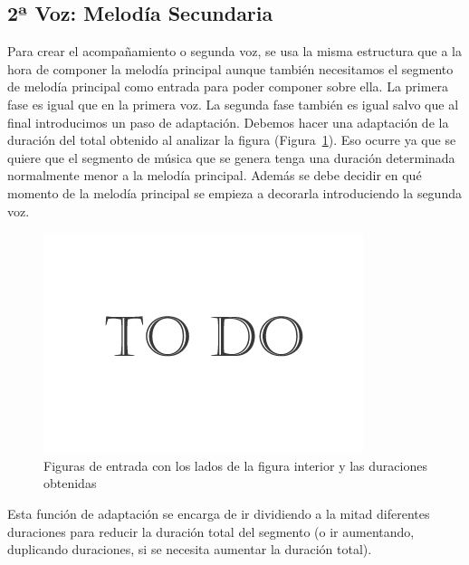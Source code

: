
\subsection{2ª Voz: Melodía Secundaria}

Para crear el acompañamiento o segunda voz, se usa la misma estructura que a la hora de componer la melodía principal aunque también necesitamos el segmento de melodía principal como entrada para poder componer sobre ella. 
La primera fase es igual que en la primera voz. La segunda fase también es igual salvo que al final introducimos un paso de adaptación. Debemos hacer una adaptación de la duración del total obtenido al analizar la figura (Figura~\ref{fig:Figura1Voz2}). Eso ocurre ya que se quiere que el segmento de música que se genera tenga una duración determinada normalmente menor a la melodía principal. Además se debe decidir en qué momento de la melodía principal se empieza a decorarla introduciendo la segunda voz.

 		\begin{figure}[htbp]
		\centering
		\hspace*{0.0in}
		\includegraphics[scale=0.57]{graphics/todo.png}
		\caption{Figuras de entrada con los lados de la figura interior y las duraciones obtenidas}
		\label{fig:Figura1Voz2}
		\end{figure}

Esta función de adaptación se encarga de ir dividiendo a la mitad diferentes duraciones para reducir la duración total del segmento (o ir aumentando, duplicando duraciones, si se necesita aumentar la duración total). 

